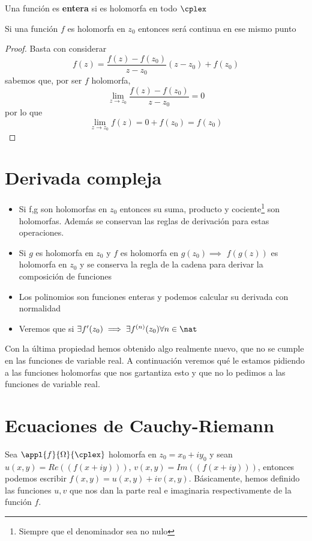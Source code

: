 \documentclass{apuntes}
\begin{document}
\begin{defn}
Una función es \textbf{entera} si es holomorfa en todo $\cplex$
\end{defn}

\begin{prop}
Si una función $f$ es holomorfa en $z_0$ entonces será continua en ese mismo punto
\end{prop}
\begin{proof}
Basta con considerar
\[f(z)=\frac{f(z)-f(z_0)}{z-z_0}(z-z_0)+f(z_0)\]
sabemos que, por ser $f$ holomorfa,
\[\lim_{z \to z_0}\frac{f(z)-f(z_0)}{z-z_0} = 0\]
por lo que
\[\lim_{z \to z_0} f(z) = 0+f(z_0)=f(z_0)\]
\end{proof}

\section{Derivada compleja}
\begin{itemize}
\item Si f,g son holomorfas en $z_0$ entonces su suma, producto y cociente\footnote{Siempre que el denominador sea no nulo} son holomorfas. Además se conservan las reglas de derivación para estas operaciones.

\item Si $g$ es holomorfa en $z_0$ y $f$ es holomorfa en $g(z_0) \implies$ $f(g(z))$ es holomorfa en $z_0$ y se conserva la regla de la cadena para derivar la composición de funciones

\item Los polinomios son funciones enteras y podemos calcular su derivada con normalidad

\item Veremos que si $\exists f'(z_0) \implies \exists f^{(n)}(z_0) \forall n \in \nat$
\end{itemize}

Con la última propiedad hemos obtenido algo realmente nuevo, que no se cumple en las funciones de variable real. A continuación veremos qué le estamos pidiendo a las funciones holomorfas que nos gartantiza esto y que no lo pedimos a las funciones de variable real.


\section{Ecuaciones de Cauchy-Riemann}
Sea $\appl{f}{\Omega}{\cplex}$ holomorfa en $z_0=x_0+iy_0$ y sean $u(x,y)=Re((f(x+iy)))$, $v(x,y)=Im((f(x+iy)))$, entonces podemos escribir $f(x,y)=u(x,y)+iv(x,y)$. Básicamente, hemos definido las funciones $u,v$ que nos dan la parte real e imaginaria respectivamente de la función $f$.
\end{document}
